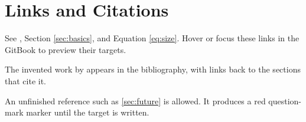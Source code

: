 \section{Links and Citations}
\label{sec:references}

See , Section \ref{sec:basics}, and
Equation \eqref{eq:size}. Hover or focus these links in the GitBook to preview
their targets.

The invented work by \citet{example-notebook} appears in the bibliography, with
links back to the sections that cite it.

An unfinished reference such as \ref{sec:future} is allowed. It produces a red
question-mark marker until the target is written.
